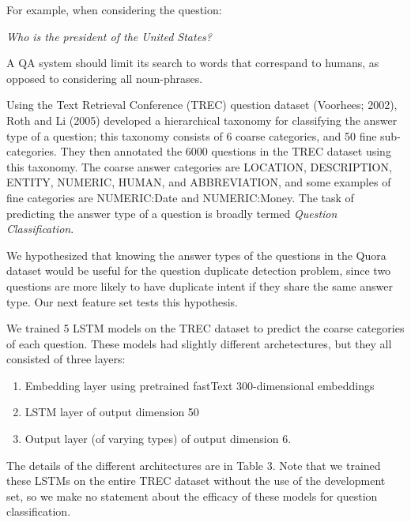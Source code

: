 \documentclass[letterpaper, 10 pt, conference]{ieeeconf}  %
\begin{document}
For example, when considering the question:
\begin{center}
\emph{Who is the president of the United States?}
\end{center}
A QA system should limit its search to words that correspand to humans, as opposed to considering all noun-phrases.

Using the Text Retrieval Conference (TREC) question dataset (Voorhees; 2002), Roth and Li (2005) developed a hierarchical taxonomy for classifying the answer type of a question; this taxonomy consists of 6 coarse categories, and 50 fine sub-categories. They then annotated the 6000 questions in the TREC dataset using this taxonomy. The coarse answer categories are LOCATION, DESCRIPTION, ENTITY, NUMERIC, HUMAN, and ABBREVIATION, and some examples of fine categories are NUMERIC:Date and NUMERIC:Money. The task of predicting the answer type of a question is broadly termed \emph{Question Classification}. 

We hypothesized that knowing the answer types of the questions in the Quora dataset would be useful for the question duplicate detection problem, since two questions are more likely to have duplicate intent if they share the same answer type. Our next feature set tests this hypothesis. 

We trained 5 LSTM models on the TREC dataset to predict the coarse categories of each question. These models had slightly different archetectures, but they all consisted of three layers:
\begin{enumerate}
\item Embedding layer using pretrained fastText 300-dimensional embeddings
\item LSTM layer of output dimension 50
\item Output layer (of varying types) of output dimension 6.
\end{enumerate}
The details of the different architectures are in Table 3. Note that we trained these LSTMs on the entire TREC dataset without the use of the development set,  so we make no statement about the efficacy of these models for question classification.
\end{document}
